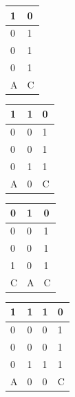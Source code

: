 	\begin{multicols}{4}
		\begin{tabular}{ l | l }
			1 & 0 \\
			\hline
			0 & 1 \\
			0 & 1 \\
			0 & 1 \\
			\hline
			A & C \\
		\end{tabular}
		\columnbreak{|}
		\begin{tabular}{ l | l l }
			1 & 1 & 0 \\
			\hline
			0 & 0 & 1 \\
			0 & 0 & 1 \\
			0 & 1 & 1 \\
			\hline
			A & 0 & C \\
		\end{tabular}
		\columnbreak{|}
		\begin{tabular}{ l l l }
			0 & 1 & 0 \\
			\hline
			0 & 0 & 1 \\
			0 & 0 & 1 \\
			1 & 0 & 1 \\
			\hline
			C & A & C \\
		\end{tabular}
		\columnbreak{|}
		\begin{tabular}{ l | l l l }
			1 & 1 & 1 & 0 \\
			\hline
			0 & 0 & 0 & 1 \\
			0 & 0 & 0 & 1 \\
			0 & 1 & 1 & 1 \\
			\hline
			A & 0 & 0 & C \\
		\end{tabular}
	\end{multicols}

